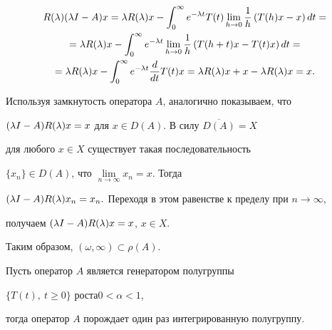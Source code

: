 \begin{pf}
\begin{multline*}
R(\l)(\l I-A)x= \l R(\l)x- \int^{\infty}_{0}e^{-\l t}T(t)


\lim\limits_{h\to 0}\frac{1}{h}\left(T(h)x -x\right)dt= \\


%


= \l R(\l)x- \int^{\infty}_{0}e^{-\l t}


\lim\limits_{h\to 0}\frac{1}{h}\left(T(h+t)x -T(t)x\right)dt= \\


%


=\l R(\l)x- \int^{\infty}_{0}e^{-\l t}\frac{d}{dt}T(t)x=


\l R(\l)x+x-\l R(\l)x=x.


\end{multline*}


Используя замкнутость оператора $A$, аналогично показываем, что


$(\lambda I-A)R(\lambda)x=x$ для $x\in D(A)$. В силу $\overline{D(A)}=X$


для любого $x\in X$ существует такая последовательность 


$\{x_n\}\in D(A)$, что $\lim\limits_{n\to \infty}x_n=x$. Тогда


$(\lambda I-A)R(\lambda)x_n=x_n.$ Переходя в этом равенстве к пределу при $n\to \infty$,


получаем $(\lambda I-A)R(\lambda)x=x$, $x\in X$.


Таким образом, $(\omega,\infty)\subset \rho(A)$.


\end{pf}





\begin{thm}\label{9}


Пусть оператор $A$ является генератором полугруппы


$\{T(t),\ t\geq0\}$ роста\linebreak $0<\alpha<1$,


тогда оператор $A$ порождает один раз интегрированную полугруппу. 


\end{thm}





